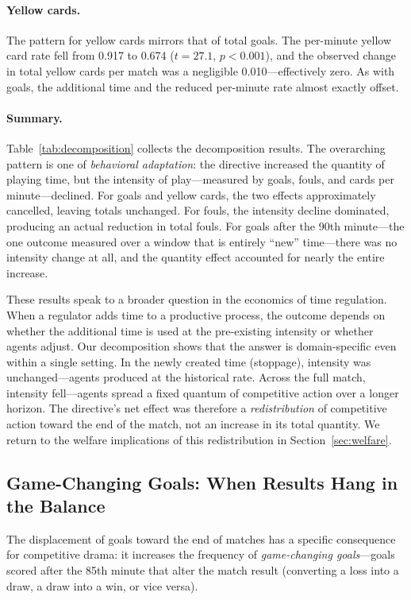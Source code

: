 \paragraph{Yellow cards.}  The pattern for yellow cards mirrors that of total goals.  The per-minute yellow card rate fell from 0.917 to 0.674 ($t = 27.1$, $p < 0.001$), and the observed change in total yellow cards per match was a negligible 0.010---effectively zero.  As with goals, the additional time and the reduced per-minute rate almost exactly offset.

\paragraph{Summary.}  Table~\ref{tab:decomposition} collects the decomposition results.  The overarching pattern is one of \emph{behavioral adaptation}: the directive increased the quantity of playing time, but the intensity of play---measured by goals, fouls, and cards per minute---declined.  For goals and yellow cards, the two effects approximately cancelled, leaving totals unchanged.  For fouls, the intensity decline dominated, producing an actual reduction in total fouls.  For goals after the 90th minute---the one outcome measured over a window that is entirely ``new'' time---there was no intensity change at all, and the quantity effect accounted for nearly the entire increase.

These results speak to a broader question in the economics of time regulation.  When a regulator adds time to a productive process, the outcome depends on whether the additional time is used at the pre-existing intensity or whether agents adjust.  Our decomposition shows that the answer is domain-specific even within a single setting.  In the newly created time (stoppage), intensity was unchanged---agents produced at the historical rate.  Across the full match, intensity fell---agents spread a fixed quantum of competitive action over a longer horizon.  The directive's net effect was therefore a \emph{redistribution} of competitive action toward the end of the match, not an increase in its total quantity.  We return to the welfare implications of this redistribution in Section~\ref{sec:welfare}.

\subsection{Game-Changing Goals: When Results Hang in the Balance}
\label{sec:game_changing}

The displacement of goals toward the end of matches has a specific consequence for competitive drama: it increases the frequency of \emph{game-changing goals}---goals scored after the 85th minute that alter the match result (converting a loss into a draw, a draw into a win, or vice versa).

